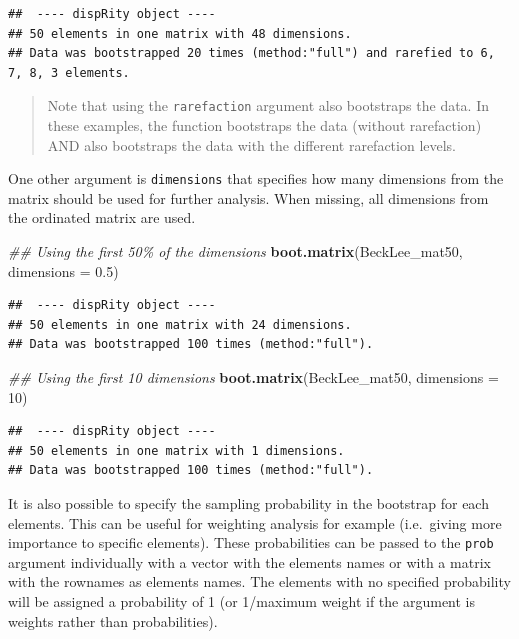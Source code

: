 \documentclass[
]{book}
\newenvironment{Shaded}{\begin{snugshade}}{\end{snugshade}}
\newcommand{\CommentTok}[1]{\textcolor[rgb]{0.56,0.35,0.01}{\textit{#1}}}
\newcommand{\DataTypeTok}[1]{\textcolor[rgb]{0.13,0.29,0.53}{#1}}
\newcommand{\DecValTok}[1]{\textcolor[rgb]{0.00,0.00,0.81}{#1}}
\newcommand{\FloatTok}[1]{\textcolor[rgb]{0.00,0.00,0.81}{#1}}
\newcommand{\KeywordTok}[1]{\textcolor[rgb]{0.13,0.29,0.53}{\textbf{#1}}}
\newcommand{\NormalTok}[1]{#1}
\begin{document}
\begin{verbatim}
##  ---- dispRity object ---- 
## 50 elements in one matrix with 48 dimensions.
## Data was bootstrapped 20 times (method:"full") and rarefied to 6, 7, 8, 3 elements.
\end{verbatim}

\begin{quote}
Note that using the \texttt{rarefaction} argument also bootstraps the data. In these examples, the function bootstraps the data (without rarefaction) AND also bootstraps the data with the different rarefaction levels.
\end{quote}

One other argument is \texttt{dimensions} that specifies how many dimensions from the matrix should be used for further analysis.
When missing, all dimensions from the ordinated matrix are used.

\begin{Shaded}
\begin{Highlighting}[]
\CommentTok{\#\# Using the first 50\% of the dimensions}
\KeywordTok{boot.matrix}\NormalTok{(BeckLee\_mat50, }\DataTypeTok{dimensions =} \FloatTok{0.5}\NormalTok{)}
\end{Highlighting}
\end{Shaded}

\begin{verbatim}
##  ---- dispRity object ---- 
## 50 elements in one matrix with 24 dimensions.
## Data was bootstrapped 100 times (method:"full").
\end{verbatim}

\begin{Shaded}
\begin{Highlighting}[]
\CommentTok{\#\# Using the first 10 dimensions}
\KeywordTok{boot.matrix}\NormalTok{(BeckLee\_mat50, }\DataTypeTok{dimensions =} \DecValTok{10}\NormalTok{)}
\end{Highlighting}
\end{Shaded}

\begin{verbatim}
##  ---- dispRity object ---- 
## 50 elements in one matrix with 1 dimensions.
## Data was bootstrapped 100 times (method:"full").
\end{verbatim}

It is also possible to specify the sampling probability in the bootstrap for each elements.
This can be useful for weighting analysis for example (i.e.~giving more importance to specific elements).
These probabilities can be passed to the \texttt{prob} argument individually with a vector with the elements names or with a matrix with the rownames as elements names.
The elements with no specified probability will be assigned a probability of 1 (or 1/maximum weight if the argument is weights rather than probabilities).
\end{document}
